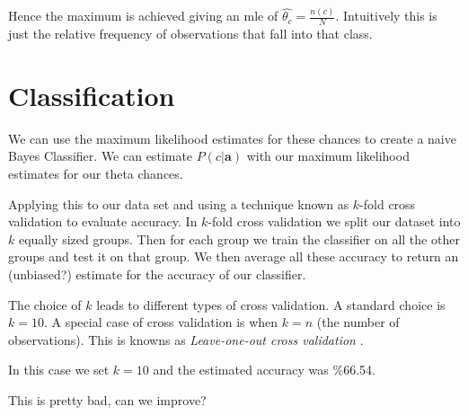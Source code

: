 Hence the maximum is achieved giving an mle of $\hat{\theta_c} = \frac{n(c)}{N}$. Intuitively this is just the relative frequency of observations that fall into that class.

\section{Classification}

We can use the maximum likelihood estimates for these chances to create a naive Bayes Classifier. We can estimate $P(c|\mathbf{a})$ with our maximum likelihood estimates for our theta chances.

Applying this to our data set and using a technique known as $k$-fold cross validation to evaluate accuracy. In $k$-fold cross validation we split our dataset into $k$ equally sized groups. Then for each group we train the classifier on all the other groups and test it on that group. We then average all these accuracy to return an (unbiased?) estimate for the accuracy of our classifier.

The choice of $k$ leads to different types of cross validation. A standard choice is $k=10$. A special case of cross validation is when $k=n$ (the number of observations). This is knowns as \textit{Leave-one-out cross validation} \cite{Priddy05}.

In this case we set $k=10$ and the estimated accuracy was \%66.54.

This is pretty bad, can we improve?
